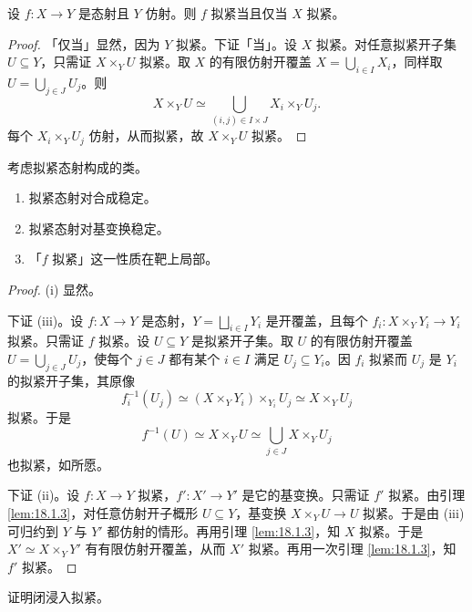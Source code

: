 \begin{lemma}\label{lem:18.1.3}
设 $f:X\to Y$ 是态射且 $Y$ 仿射。则 $f$ 拟紧当且仅当 $X$ 拟紧。
\end{lemma}

\begin{proof}
「仅当」显然，因为 $Y$ 拟紧。下证「当」。设 $X$ 拟紧。对任意拟紧开子集 $U\subseteq Y$，只需证 $X\times_Y U$ 拟紧。取 $X$ 的有限仿射开覆盖 $X=\bigcup_{i\in I}X_i$，同样取 $U=\bigcup_{j\in J}U_j$。则
\[
X\times_Y U\simeq\bigcup_{(i,j)\in I\times J}X_i\times_Y U_j.
\]
每个 $X_i\times_Y U_j$ 仿射，从而拟紧，故 $X\times_Y U$ 拟紧。
\end{proof}

\begin{lemma}\label{lem:18.1.4}
考虑拟紧态射构成的类。
\begin{enumerate}[label=(\roman*),leftmargin=2em,itemsep=0.25ex]
  \item 拟紧态射对合成稳定。
  \item 拟紧态射对基变换稳定。
  \item 「$f$ 拟紧」这一性质在靶上局部。
\end{enumerate}
\end{lemma}

\begin{proof}
(i) 显然。

下证 (iii)。设 $f:X\to Y$ 是态射，$Y=\bigsqcup_{i\in I}Y_i$ 是开覆盖，且每个 $f_i:X\times_Y Y_i\to Y_i$ 拟紧。只需证 $f$ 拟紧。设 $U\subseteq Y$ 是拟紧开子集。取 $U$ 的有限仿射开覆盖 $U=\bigcup_{j\in J}U_j$，使每个 $j\in J$ 都有某个 $i\in I$ 满足 $U_j\subseteq Y_i$。因 $f_i$ 拟紧而 $U_j$ 是 $Y_i$ 的拟紧开子集，其原像
\[
f_i^{-1}(U_j)\simeq(X\times_Y Y_i)\times_{Y_i}U_j\simeq X\times_Y U_j
\]
拟紧。于是
\[
f^{-1}(U)\simeq X\times_Y U\simeq\bigcup_{j\in J}X\times_Y U_j
\]
也拟紧，如所愿。

下证 (ii)。设 $f:X\to Y$ 拟紧，$f':X'\to Y'$ 是它的基变换。只需证 $f'$ 拟紧。由引理 \ref{lem:18.1.3}，对任意仿射开子概形 $U\subseteq Y$，基变换 $X\times_Y U\to U$ 拟紧。于是由 (iii) 可归约到 $Y$ 与 $Y'$ 都仿射的情形。再用引理 \ref{lem:18.1.3}，知 $X$ 拟紧。于是 $X'\simeq X\times_Y Y'$ 有有限仿射开覆盖，从而 $X'$ 拟紧。再用一次引理 \ref{lem:18.1.3}，知 $f'$ 拟紧。
\end{proof}

\begin{exercise}\label{exc:18.1.5}
证明闭浸入拟紧。
\end{exercise}

